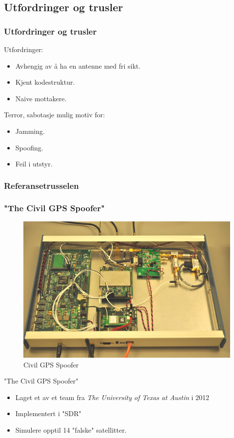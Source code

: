 \documentclass[xcolor=table]{beamer}
\begin{document}
\subsection{Utfordringer og trusler}
\begin{frame}
\frametitle{Utfordringer og trusler}
Utfordringer:
  \begin{itemize}
    \item Avhengig av å ha en antenne med fri sikt.
    \item Kjent kodestruktur.
    \item Naive mottakere.
  \end{itemize}
  Terror, sabotasje mulig motiv for:
  \begin{itemize}
    \item Jamming.
    \item Spoofing.
    \item Feil i utstyr.
  \end{itemize}  
\end{frame}

\subsubsection{Referansetrusselen}
\begin{frame}
  \frametitle{"The Civil GPS Spoofer"}
  \begin{figure}
    \includegraphics[scale=0.2]{pics/texas_spoofer.jpg}
    \caption{Civil GPS Spoofer}
  \end{figure}
  "The Civil GPS Spoofer"
  \begin{itemize}
    \item Laget et av et team fra \textit{The University of Texas at Austin} i 2012 \cite{EVPMUGA}
    \item Implementert i "SDR"
    \item Simulere opptil 14 "falske" satellitter.
  \end{itemize}
\end{frame}
\end{document}
